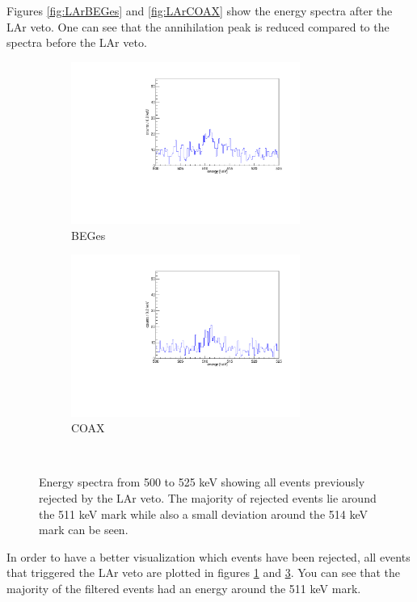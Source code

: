 \documentclass[encoding=utf8,british]{tumphthesis}
\begin{document}
Figures \ref{fig:LArBEGes} and \ref{fig:LArCOAX} show the energy spectra after the LAr veto.
One can see that the annihilation peak is reduced compared to the spectra before the LAr veto.
\\

\begin{figure}[t!]
	\centering
	\begin{subfigure}{.5\textwidth}
		\includegraphics[width=75mm]{./Bilder/AntiLArBEGe.pdf}
		\caption{BEGes}
		\label{fig:AntiLArBEGes}
	\end{subfigure}\hfill%
	\begin{subfigure}{.5\textwidth}
		\includegraphics[width=75mm]{./Bilder/AntiLArCOAX.pdf}
		\caption{COAX}
		\label{fig:AntiLArCOAX}
	\end{subfigure}
	\\
	\vspace{0.5cm}
	\caption{Energy spectra from 500 to 525 keV showing all events previously rejected by the LAr veto. The majority of rejected events lie around the 511 keV mark while also a small deviation around the 514 keV mark can be seen.}
\end{figure}

In order to have a better visualization which events have been rejected, all events that triggered the LAr veto are plotted in figures \ref{fig:AntiLArBEGes} and \ref{fig:AntiLArCOAX}.
You can see that the majority of the filtered events had an energy around the 511 keV mark.
\\
\end{document}
